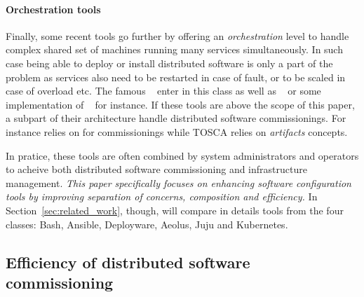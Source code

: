 \paragraph{Orchestration tools}
Finally, some recent tools go further by offering an
\emph{orchestration} level to handle complex shared set of machines
running many services simultaneously. In such case being able to
deploy or install distributed software is only a part of the problem
as services also need to be restarted in case of fault, or to be
scaled in case of overload etc. The famous \kubernetes~\cite{} enter
in this class as well as \dockerswarm~\cite{} or some implementation
of \tosca~\cite{} for instance. If these tools are above the scope of
this paper, a subpart of their architecture handle distributed
software commissionings. For instance \kubernetes relies on \docker
for commissionings while TOSCA relies on \emph{artifacts} concepts.

In pratice, these tools are often combined by system administrators
and operators to acheive both distributed software commissioning and
infrastructure management. \emph{This paper specifically focuses on
enhancing \emph{software configuration tools} by improving separation
of concerns, composition and efficiency.} In
Section~\ref{sec:related_work}, though, will compare in details tools
from the four classes: Bash, Ansible, Deployware, Aeolus, Juju and
Kubernetes.

\subsection{Efficiency of distributed software commissioning}

